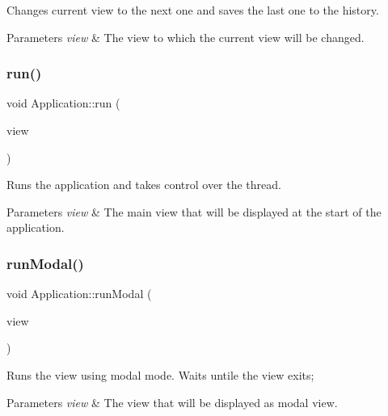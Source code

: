 Changes current view to the next one and saves the last one to the history. 


\begin{DoxyParams}{Parameters}
{\em view} & The view to which the current view will be changed. \\
\hline
\end{DoxyParams}
\mbox{\label{class_application_a9ca5a609b230392b1bb06917ac097de6}} 
\subsubsection{\texorpdfstring{run()}{run()}}
{\footnotesize\ttfamily void Application\+::run (\begin{DoxyParamCaption}\item[{\mbox{\hyperlink{class_ref}{Ref}}$<$ \mbox{\hyperlink{class_view}{View}} $>$}]{view }\end{DoxyParamCaption})}



Runs the application and takes control over the thread. 


\begin{DoxyParams}{Parameters}
{\em view} & The main view that will be displayed at the start of the application. \\
\hline
\end{DoxyParams}
\mbox{\label{class_application_a782adfa17cf6a50b9242c0eb22447206}} 
\subsubsection{\texorpdfstring{runModal()}{runModal()}}
{\footnotesize\ttfamily void Application\+::run\+Modal (\begin{DoxyParamCaption}\item[{\mbox{\hyperlink{class_ref}{Ref}}$<$ \mbox{\hyperlink{class_view}{View}} $>$}]{view }\end{DoxyParamCaption})}



Runs the view using modal mode. Waits untile the view exits; 


\begin{DoxyParams}{Parameters}
{\em view} & The view that will be displayed as modal view. \\
\hline
\end{DoxyParams}
\mbox{\label{class_application_a17a7ce731c6cae502839fca4bfc726ea}} 
